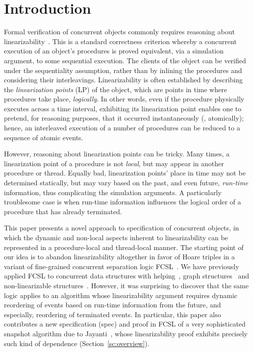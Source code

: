 \section{Introduction}
\label{sc:intro} 
   
Formal verification of concurrent objects commonly requires reasoning
about linearizability~\cite{HerlihyW+TOPLAS90}. This is a standard
correctness criterion whereby a concurrent execution of an object's
procedures is proved equivalent, via a simulation argument, to some
sequential execution. The clients of the object can be verified under
the sequentiality assumption, rather than by inlining the procedures
and considering their interleavings. Linearizability is often
established by describing the \emph{linearization points} (LP) of the
object, which are points in time where procedures take place,
\emph{logically}.  In other words, even if the procedure physically
executes across a time interval, exhibiting its linearization point
enables one to pretend, for reasoning purposes, that it occurred
instantaneously (\ie, atomically); hence, an interleaved execution of
a number of procedures can be reduced to a sequence of atomic events.

However, reasoning about linearization points can be tricky. Many
times, a linearization point of a procedure is not \emph{local}, but
may appear in another procedure or thread. Equally bad, linearization
points' place in time may not be determined statically, but may vary
based on the past, and even future, \emph{run-time} information, thus
complicating the simulation arguments. A particularly troublesome case
is when run-time information influences the logical order of a
procedure that has already terminated.

This paper presents a novel approach to specification of concurrent
objects, in which the dynamic and non-local aspects inherent to
linearizability can be represented in a procedure-local and
thread-local manner. The starting point of our idea is to abandon
linearizability altogether in favor of Hoare triples in a variant of
fine-grained concurrent separation logic
FCSL~\cite{NanevskiLSD+ESOP14}. We have previously applied FCSL to
concurrent data structures with helping~\cite{SergeyNB+ESOP15}, graph
structures~\cite{SergeyNB+PLDI15} and non-linearizable
structures~\cite{SergeyNBD+OOPSLA16}. However, it was surprising to
discover that the same logic applies to an algorithm whose
linearizability argument requires dynamic reordering of events based
on run-time information from the future, and especially, reordering of
terminated events. In particular, this paper also contributes a new
specification (spec) and proof in FCSL of a very sophisticated
snapshot algorithm due to Jayanti~\cite{Jayanti+STOC05}, whose
linearizability proof exhibits precisely such kind of dependence
(Section~\ref{sc:overview}).

